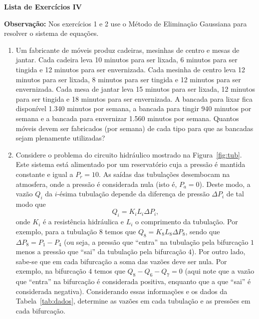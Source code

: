 \documentclass[11pt,a4paper]{article}
\begin{document}
\begin{center}
 \textbf{Lista de Exercícios IV}
\end{center}

\textbf{Observação:} Nos exercícios 1 e 2 use o Método de Eliminação Gaussiana para resolver o sistema de equações.

\begin{enumerate}
  \item Um fabricante de móveis produz cadeiras, mesinhas de centro e mesas
de jantar. Cada cadeira leva 10 minutos para ser lixada, 6 minutos
para ser tingida e 12 minutos para ser envernizada. Cada mesinha de
centro leva 12 minutos para ser lixada, 8 minutos para ser tingida
e 12 minutos para ser envernizada. Cada mesa de jantar leva 15 minutos
para ser lixada, 12 minutos para ser tingida e 18 minutos para ser
envernizada. A bancada para lixar fica disponível 1.340 minutos por
semana, a bancada para tingir 940 minutos por semana e a bancada para
envernizar 1.560 minutos por semana. Quantos móveis devem ser fabricados
(por semana) de cada tipo para que as bancadas sejam plenamente utilizadas?

 \item Considere o problema do circuito hidráulico mostrado na Figura~\ref{fig:tub}. Este sistema está alimentado por um reservatório 
cuja a pressão é mantida constante e igual a $P_r = 10$. As saídas das tubulações desembocam na atmosfera, onde a pressão é 
considerada nula (isto é, $P_a = 0$). Deste modo, a vazão $Q_i$ da $i$-ésima tubulação depende da diferença de pressão $\Delta P_i$ 
de tal modo que $$Q_i = K_iL_i\Delta P_i,$$ onde $K_i$ é a resistência hidráulica e $L_i$ o comprimento da tubulação. Por exemplo, para a 
tubulação $8$ temos que $Q_8 = K_8L_8\Delta P_8$, sendo que $\Delta P_8 = P_1 - P_4$ (ou seja, a pressão que ``entra'' na tubulação pela 
bifurcação $1$ menos a pressão que ``sai'' da tubulação pela bifurcação $4$). Por outro lado, sabe-se que em cada bifurcação a soma das vazões 
deve ser nula. Por exemplo, na bifurcação $4$ temos que $Q_8 - Q_6 - Q_7 = 0$ (aqui note que a vazão que ``entra'' na bifurcação é considerada positiva, 
enquanto que a que ``sai'' é considerada negativa). Considerando essas informações e os dados da Tabela~\ref{tab:dados}, determine as vazões em cada tubulação e as pressões 
em cada bifurcação.


\end{enumerate}
\end{document}
